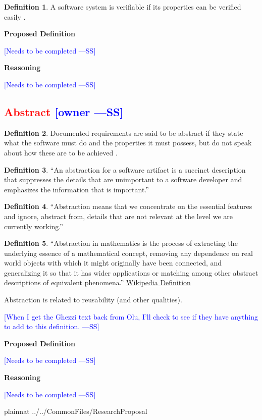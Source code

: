 \documentclass[letterpaper,cleveref]{lipics-v2019}
\newcommand{\authornote}[3]{\textcolor{#1}{[#3 ---#2]}}
\newcommand{\authornote}[3]{}
\newcommand{\wss}[1]{\authornote{blue}{SS}{#1}} %
\newcommand{\notdone}[1]{\textcolor{red}{#1}}
\theoremstyle{definition}
\newtheorem{defn}{Definition}
\begin{document}
\begin{defn}
  A software system is verifiable if its properties can be verified easily
  \citep{ghezzi1991fundamentals}.
\end{defn}

\noindent \textbf{Proposed Definition} 

\wss{Needs to be completed}

\noindent \textbf{Reasoning}

\wss{Needs to be completed}

\subsection{\notdone{Abstract} \wss{owner}}

\begin{defn}
  Documented requirements are said to be abstract if they state what the
  software must do and the properties it must possess, but do not speak about
  how these are to be achieved \citep{GhezziEtAl2003}.
\end{defn}

\begin{defn}
  ``An abstraction for a software artifact is a succinct description that
  suppresses the details that are unimportant to a software developer and
  emphasizes the information that is important.'' \citep{Krueger1992}
\end{defn}

\begin{defn}
  ``Abstraction means that we concentrate on the essential features and ignore,
  abstract from, details that are not relevant at the level we are currently
  working.''  \citep[p.\ 296]{VanVliet2000}
\end{defn}

\begin{defn}
  ``Abstraction in mathematics is the process of extracting the underlying
  essence of a mathematical concept, removing any dependence on real world
  objects with which it might originally have been connected, and generalizing
  it so that it has wider applications or matching among other abstract
  descriptions of equivalent phenomena.''
  \href{https://en.wikipedia.org/wiki/Abstraction_(mathematics)} {Wikipedia
    Definition}
\end{defn}

Abstraction is related to reusability (and other qualities).

\wss{When I get the Ghezzi text back from Olu, I'll check to see if they have
  anything to add to this definition.}

\noindent \textbf{Proposed Definition} 

\wss{Needs to be completed}

\noindent \textbf{Reasoning}

\wss{Needs to be completed}

\newpage

 {plainnat}
 {../../CommonFiles/ResearchProposal}
\end{document}
